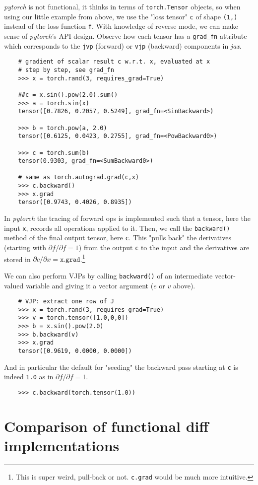 \documentclass[paper=a4,11pt,headsepline]{scrartcl}
\newcommand{\ve}[1]{\ensuremath{\bm{\mathit{#1}}}}
\newcommand{\pdi}[2]{\partial #1/\partial #2}
\newcommand{\soft}[1]{\textsl{#1}\xspace}
\newcommand{\pytorch}{\soft{pytorch}}
\newcommand{\jax}{\soft{jax}}
\newcommand{\co}[1]{\texttt{#1}}
\begin{document}
\pytorch is not functional, it thinks in terms of \co{torch.Tensor} objects, so
when using our little example from above, we use the "loss tensor" \co{c} of
shape \co{(1,)} instead of the loss function \co{f}. With knowledge of reverse
mode, we can make sense of \pytorch's API design. Observe how each tensor has a
\verb|grad_fn| attribute which corresponds to the \co{jvp} (forward) or
\co{vjp} (backward) components in \jax.
%
\begin{verbatim}
    # gradient of scalar result c w.r.t. x, evaluated at x
    # step by step, see grad_fn
    >>> x = torch.rand(3, requires_grad=True)

    ##c = x.sin().pow(2.0).sum()
    >>> a = torch.sin(x)
    tensor([0.7826, 0.2057, 0.5249], grad_fn=<SinBackward>)

    >>> b = torch.pow(a, 2.0)
    tensor([0.6125, 0.0423, 0.2755], grad_fn=<PowBackward0>)

    >>> c = torch.sum(b)
    tensor(0.9303, grad_fn=<SumBackward0>)

    # same as torch.autograd.grad(c,x)
    >>> c.backward()
    >>> x.grad
    tensor([0.9743, 0.4026, 0.8935])
\end{verbatim}
%
In \pytorch the tracing of forward ops is implemented such that a tensor, here
the input \co{x}, records all operations applied to it. Then, we call the
\co{backward()} method of the final output tensor, here \co{c}. This
"pulls back" the derivatives (starting with $\pdi{f}{f}=1$) from the output
\co{c} to the input and the derivatives are stored in $\pdi{c}{\ve x} =
\co{x.grad}$.\footnote{This is super weird, pull-back or not.
\co{c.grad} would be much more intuitive.}

We can also perform VJPs by calling \co{backward()} of an intermediate
vector-valued variable and giving it a vector argument ($\ve
e$ or $\ve v$ above).
%
\begin{verbatim}
    # VJP: extract one row of J
    >>> x = torch.rand(3, requires_grad=True)
    >>> v = torch.tensor([1.0,0,0])
    >>> b = x.sin().pow(2.0)
    >>> b.backward(v)
    >>> x.grad
    tensor([0.9619, 0.0000, 0.0000])
\end{verbatim}
And in particular the default for "seeding" the backward pass starting at \co{c}
is indeed \co{1.0} as in $\pdi{f}{f}=1$.
\begin{verbatim}
    >>> c.backward(torch.tensor(1.0))
\end{verbatim}

\section{Comparison of functional diff implementations}
\end{document}
